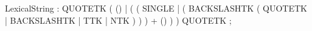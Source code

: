 %
%
%
\begin{rail}
LexicalString : QUOTETK
                ( ()
                | ( ( SINGLE
                    | ( BACKSLASHTK ( QUOTETK | BACKSLASHTK | TTK | NTK )  )
                    ) + () )
                )
                QUOTETK ;
\end{rail}
